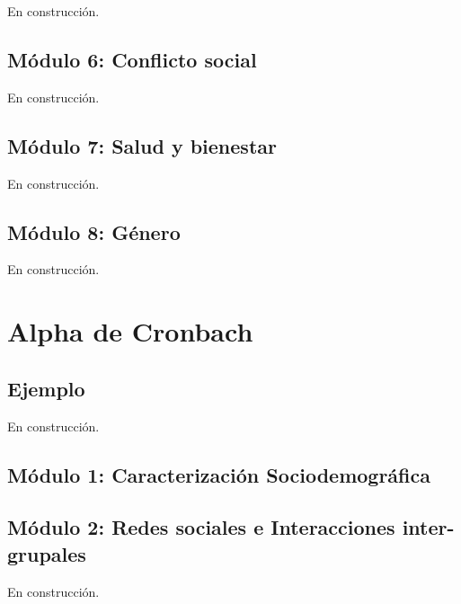 \documentclass[
  12pt,
]{book}
\begin{document}
En construcción.

\hypertarget{muxf3dulo-6-conflicto-social}{%
\section{Módulo 6: Conflicto social}\label{muxf3dulo-6-conflicto-social}}

En construcción.

\hypertarget{muxf3dulo-7-salud-y-bienestar}{%
\section{Módulo 7: Salud y bienestar}\label{muxf3dulo-7-salud-y-bienestar}}

En construcción.

\hypertarget{muxf3dulo-8-guxe9nero}{%
\section{Módulo 8: Género}\label{muxf3dulo-8-guxe9nero}}

En construcción.

\hypertarget{alpha-de-cronbach}{%
\chapter{Alpha de Cronbach}\label{alpha-de-cronbach}}

\hypertarget{ejemplo-1}{%
\section{Ejemplo}\label{ejemplo-1}}

En construcción.

\hypertarget{muxf3dulo-1-caracterizaciuxf3n-sociodemogruxe1fica-1}{%
\section{Módulo 1: Caracterización Sociodemográfica}\label{muxf3dulo-1-caracterizaciuxf3n-sociodemogruxe1fica-1}}

\hypertarget{muxf3dulo-2-redes-sociales-e-interacciones-inter-grupales-1}{%
\section{Módulo 2: Redes sociales e Interacciones inter-grupales}\label{muxf3dulo-2-redes-sociales-e-interacciones-inter-grupales-1}}

En construcción.
\end{document}
